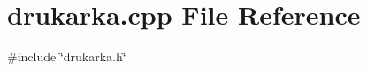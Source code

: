 \section{drukarka.\+cpp File Reference}
\label{drukarka_8cpp}
{\ttfamily \#include \char`\"{}drukarka.\+h\char`\"{}}\newline
